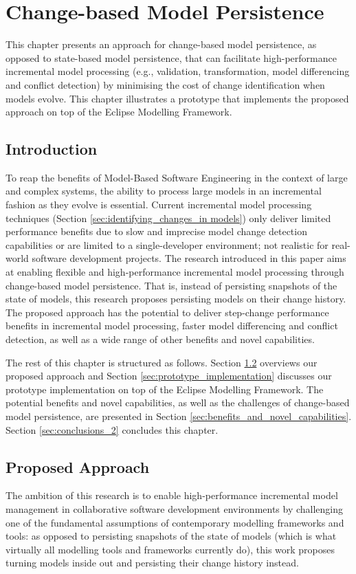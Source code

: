 \chapter{Change-based Model Persistence}
\label{ch:change_based_model_persitence}
This chapter presents an approach for change-based model 
persistence, as opposed to state-based model persistence,
that can facilitate high-performance incremental model processing 
(e.g., validation, transformation,
model differencing and conflict detection) by minimising the cost 
of change identification when models evolve. 
This chapter illustrates a prototype that implements the proposed
approach on top of the Eclipse Modelling Framework.

\section{Introduction}
\label{Introduction}
To reap the benefits of Model-Based Software Engineering in the context 
of large and complex systems, the ability to process large models 
in an incremental fashion as they evolve is essential. 
Current incremental model processing techniques 
(Section \ref{sec:identifying_changes_in models}) only deliver limited 
performance benefits due to slow and imprecise model change detection 
capabilities or are limited to a single-developer environment;
not realistic for real-world software development projects.
The research introduced in this paper aims at enabling flexible 
and high-performance incremental model processing through 
change-based model persistence. That is, instead of persisting snapshots 
of the state of models, this research proposes persisting models on their change history. The proposed approach has the potential to 
deliver step-change performance benefits in incremental model processing, 
faster model differencing and conflict detection, 
as well as a wide range of other benefits and novel capabilities.

The rest of this chapter is structured as follows. 
Section \ref{sec:proposed_approach} overviews our proposed approach 
and Section \ref{sec:prototype_implementation} discusses our prototype 
implementation on top of the Eclipse Modelling Framework. 
The potential benefits and novel capabilities, as well as the challenges 
of change-based model persistence, are presented in 
Section \ref{sec:benefits_and_novel_capabilities}. Section \ref{sec:conclusions_2} concludes this chapter.

\section{Proposed Approach}
\label{sec:proposed_approach}
The ambition of this research is to enable high-performance incremental model management in collaborative software development environments by challenging one of the fundamental assumptions of contemporary modelling frameworks and tools: as opposed to persisting snapshots of the state of models (which is what virtually all modelling tools and frameworks currently do), this work proposes turning models inside out and persisting their change history instead.

